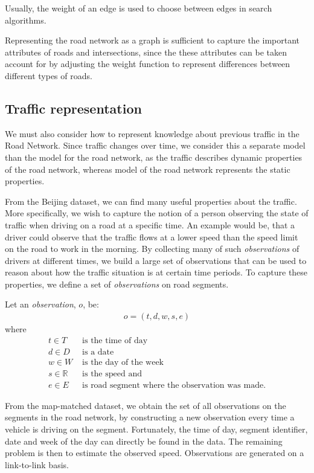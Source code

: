 Usually, the weight of an edge is used to choose between edges in search algorithms.

Representing the road network as a graph is sufficient to capture the important attributes of roads and intersections, since the these attributes can be taken account for by adjusting the weight function to represent differences between different types of roads.

\subsection{Traffic representation}\label{KR:traffic}
We must also consider how to represent knowledge about previous traffic in the Road Network. Since traffic changes over time, we consider this a separate model than the model for the road network, as the traffic describes dynamic properties of the road network, whereas model of the road network represents the static properties.

From the Beijing dataset, we can find many useful properties about the traffic. More specifically, we wish to capture the notion of a person observing the state of traffic when driving on a road at a specific time. An example would be, that a driver could observe that the traffic flows at a lower speed than the speed limit on the road to work in the morning. By collecting many of such \emph{observations} of drivers at different times, we build a large set of observations that can be used to reason about how the traffic situation is at certain time periods. To capture these properties, we define a set of \emph{observations} on road segments.

Let an \emph{observation}, $o$, be:
\begin{align*}
o = (t, d, w, s, e)
\end{align*}
where
\begin{align*}
t \in T &\text{ is the time of day} \\
d \in D &\text{ is a date} \\
w \in W &\text{ is the day of the week} \\
s \in \mathbb{R} &\text{ is the speed and}\\
e \in E &\text{ is road segment where the observation was made.}
\end{align*}

From the map-matched dataset, we obtain the set of all observations on the segments in the road network, by constructing a new observation every time a vehicle is driving on the segment. Fortunately, the time of day, segment identifier, date and week of the day can directly be found in the data. The remaining problem is then to estimate the observed speed. Observations are generated on a link-to-link basis.

